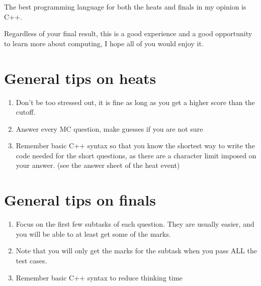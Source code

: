 The best programming language for both the heats and finals in my opinion is C++.
\vspace{6mm}

Regardless of your final result, this is a good experience and a good opportunity to learn more about computing, I hope all of you would enjoy it.

\section{General tips on heats}
\begin{enumerate}
    \item Don't be too stressed out, it is fine as long as you get a higher score than the cutoff.
    \item Answer every MC question, make guesses if you are not sure 
    \item Remember basic C++ syntax so that you know the shortest way to write the code needed for the short questions, as there are a character limit imposed on your answer. (see the answer sheet of the heat event)
\end{enumerate}

\section{General tips on finals}
\begin{enumerate}
    \item Focus on the first few subtasks of each question. They are usually easier, and you will be able to at least get some of the marks.
    \item Note that you will only get the marks for the subtask when you pass ALL the test cases.
    \item Remember basic C++ syntax to reduce thinking time
\end{enumerate}